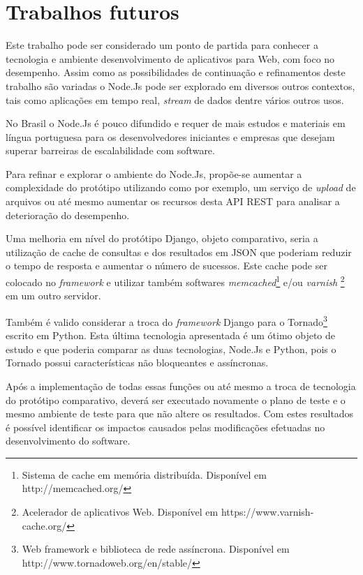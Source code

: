   
\section{Trabalhos futuros}
\label{trabalhos-furutos}
  
  Este trabalho pode ser considerado um ponto de partida para conhecer a tecnologia e ambiente desenvolvimento de aplicativos 
  para Web, com foco no desempenho. Assim como as possibilidades de continuação e refinamentos deste trabalho 
  são variadas o Node.Js pode ser explorado em diversos outros contextos, tais como aplicações em tempo real, \textit{stream} de dados dentre 
  vários outros usos.
  
  No Brasil o Node.Js é pouco difundido e requer de mais estudos e materiais em língua portuguesa para os desenvolvedores iniciantes
  e empresas que desejam superar barreiras de escalabilidade com software. 
  
  Para refinar e explorar o ambiente do Node.Js, propõe-se aumentar a complexidade do protótipo utilizando como por
  exemplo, um serviço de \textit{upload} de arquivos ou até mesmo aumentar os recursos desta API REST para analisar 
  a deterioração do desempenho.
 
  Uma melhoria em nível do protótipo Django, objeto comparativo, seria a utilização de cache de consultas e dos resultados em \ac{JSON} que poderiam
  reduzir o tempo de resposta e aumentar o número de sucessos. Este cache pode ser colocado no \textit{framework} e utilizar também
  softwares \textit{memcached}\footnote[20]{Sistema de cache em memória distribuída. Disponível em http://memcached.org/} e/ou \textit{varnish}
  \footnote[21]{Acelerador de aplicativos Web. Disponível em https://www.varnish-cache.org/} em um outro servidor.\cite{usandodjango}
  
  Também é valido considerar a troca do \textit{framework} Django para o Tornado\footnote[22]{Web framework e biblioteca de rede 
  assíncrona. Disponível em http://www.tornadoweb.org/en/stable/} escrito em Python.
  Esta última tecnologia apresentada é um ótimo objeto de estudo e que poderia comparar as duas tecnologias, Node.Js e Python, pois 
  o Tornado possui características não bloqueantes e assíncronas.\cite{tornadogloboesporte}

  Após a implementação de todas essas funções ou até mesmo a troca de tecnologia do protótipo comparativo, 
  deverá ser executado novamente o plano de teste e o mesmo ambiente de teste para que não altere os resultados. Com estes
  resultados é possível identificar os impactos causados pelas modificações efetuadas no desenvolvimento do software.